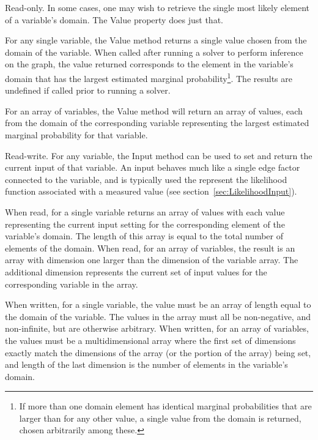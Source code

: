 Read-only.  In some cases, one may wish to retrieve the single most likely element of a variable's domain.  The Value property does just that.

For any single variable, the Value method returns a single value chosen from the domain of the variable.  When called after running a solver to perform inference on the graph, the value returned corresponds to the element in the variable's domain that has the largest estimated marginal probability\footnote{If more than one domain element has identical marginal probabilities that are larger than for any other value, a single value from the domain is returned, chosen arbitrarily among these.}.  The results are undefined if called prior to running a solver.

For an array of variables, the Value method will return an array of values, each from the domain of the corresponding variable representing the largest estimated marginal probability for that variable.

\label{sec:Discrete.Input}

Read-write.  For any variable, the Input method can be used to set and return the current input of that variable. An input behaves much like a single edge factor connected to the variable, and is typically used the represent the likelihood function associated with a measured value (see section~\ref{sec:LikelihoodInput}).

When read, for a single variable returns an array of values with each value representing the current input setting for the corresponding element of the variable's domain.  The length of this array is equal to the total number of elements of the domain.  When read, for an array of variables, the result is an array with dimension one larger than the dimension of the variable array.  The additional dimension represents the current set of input values for the corresponding variable in the array.

When written, for a single variable, the value must be an array of length equal to the domain of the variable.  The values in the array must all be non-negative, and non-infinite, but are otherwise arbitrary.  When written, for an array of variables, the values must be a multidimensional array where the first set of dimensions exactly match the dimensions of the array (or the portion of the array) being set, and length of the last dimension is the number of elements in the variable's domain.


\label{sec:Discrete.FixedValue}

